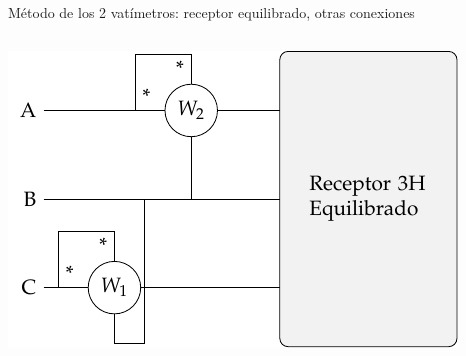 \documentclass[aspectratio=169, usenames,svgnames,dvipsnames]{beamer}
\begin{document}
\begin{frame}{Método de los 2 vatímetros: \hspace{3mm}receptor equilibrado, \hspace{3mm}otras conexiones}
\begin{columns}
\begin{column}{0.33\columnwidth}
\begin{center}
            \includegraphics[width=1\linewidth]{../figs/Potencia_3H_equilibrado_CA.pdf}
        \end{center}
    \end{column}
    \end{columns}
\end{frame}

\end{document}
